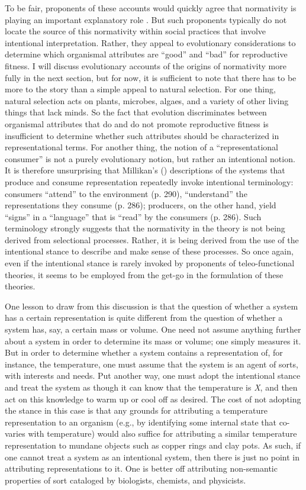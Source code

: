 To be fair, proponents of these accounts would quickly agree that normativity is playing an important explanatory role \citep{Millikan:1989,Dennett:1987}. But such proponents typically do not locate the source of this normativity within social practices that involve intentional interpretation. Rather, they appeal to evolutionary considerations to determine which organismal attributes are ``good'' and ``bad'' for reproductive fitness. I will discuss evolutionary accounts of the origins of normativity more fully in the next section, but for now, it is sufficient to note that there has to be more to the story than a simple appeal to natural selection. For one thing, natural selection acts on plants, microbes, algaes, and a variety of other living things that lack minds. So the fact that evolution discriminates between organismal attributes that do and do not promote reproductive fitness is insufficient to determine whether such attributes should be characterized in representational terms. For another thing, the notion of a ``representational consumer'' is not a purely evolutionary notion, but rather an intentional notion. It is therefore unsurprising that Millikan's (\citeyear{Millikan:1987}) descriptions of the systems that produce and consume representation repeatedly invoke intentional terminology: consumers ``attend'' to the environment (p. 290), ``understand'' the representations they consume (p. 286); producers, on the other hand, yield ``signs'' in a ``language'' that is ``read'' by the consumers (p. 286). Such terminology strongly suggests that the normativity in the theory is not being derived from selectional processes. Rather, it is being derived from the use of the intentional stance to describe and make sense of these processes. So once again, even if the intentional stance is rarely invoked by proponents of teleo-functional theories, it seems to be employed from the get-go in the formulation of these theories.  

One lesson to draw from this discussion is that the question of whether a system has a certain representation is quite different from the question of whether a system has, say, a certain mass or volume. One need not assume anything further about a system in order to determine its mass or volume; one simply measures it. But in order to determine whether a system contains a representation of, for instance, the temperature, one must assume that the system is an agent of sorts, with interests and needs. Put another way, one must adopt the intentional stance and treat the system as though it can know that the temperature is \textit{X}, and then act on this knowledge to warm up or cool off as desired. The cost of not adopting the stance in this case is that any grounds for attributing a temperature representation to an organism (e.g., by identifying some internal state that co-varies with temperature) would also suffice for attributing a similar temperature representation to mundane objects such as copper rings and clay pots. As such, if one cannot treat a system as an intentional system, then there is just no point in attributing representations to it. One is better off attributing non-semantic properties of sort cataloged by biologists, chemists, and physicists.  

